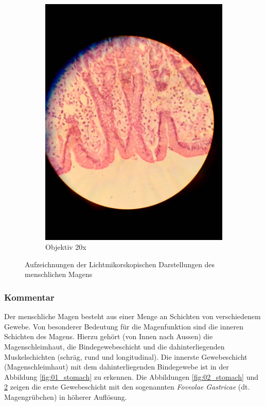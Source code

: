 \begin{figure}[h!]
\begin{subfigure}[b]{0.3\textwidth}
		\includegraphics[width=1\textwidth]{../images/03_stomach.jpg}
		\caption{Objektiv 20x}
		\label{fig:03_stomach}
	\end{subfigure}
	\caption{Aufzeichnungen der Lichtmikorskopischen Darstellungen des
		menschlichen Magens}
\end{figure}

\subsubsection{Kommentar}
Der menschliche Magen besteht aus einer Menge an Schichten von verschiedenem
Gewebe. Von besonderer Bedeutung für die Magenfunktion sind die inneren
Schichten des Magens. Hierzu gehört (von Innen nach Aussen) die
Magenschleimhaut, die Bindegewebeschicht und die dahinterliegenden
Muskelschichten (schräg, rund und longitudinal). Die innerste Gewebeschicht
(Magenschleimhaut) mit dem dahinterliegenden Bindegewebe ist in der
Abbildung \ref{fig:01_stomach} zu erkennen. Die Abbildungen
\ref{fig:02_stomach} und \ref{fig:03_stomach} zeigen die erste Gewebeschicht
mit den sogenannten \textit{Foveolae Gastricae} (dt. Magengrübchen) in
höherer Auflösung.

